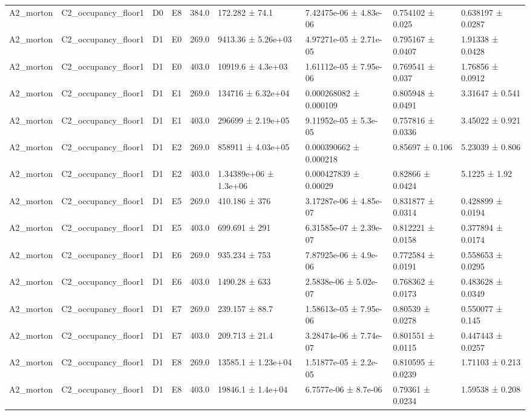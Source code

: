 \begin{table}
\begin{tabular}{lllllllll}
A2\_morton & C2\_occupancy\_floor1 & D0 & E8 & 384.0 & 172.282 ± 74.1 & 7.42475e-06 ± 4.83e-06 & 0.754102 ± 0.025 & 0.638197 ± 0.0287 \\
A2\_morton & C2\_occupancy\_floor1 & D1 & E0 & 269.0 & 9413.36 ± 5.26e+03 & 4.97271e-05 ± 2.71e-05 & 0.795167 ± 0.0407 & 1.91338 ± 0.0428 \\
A2\_morton & C2\_occupancy\_floor1 & D1 & E0 & 403.0 & 10919.6 ± 4.3e+03 & 1.61112e-05 ± 7.95e-06 & 0.769541 ± 0.037 & 1.76856 ± 0.0912 \\
A2\_morton & C2\_occupancy\_floor1 & D1 & E1 & 269.0 & 134716 ± 6.32e+04 & 0.000268082 ± 0.000109 & 0.805948 ± 0.0491 & 3.31647 ± 0.541 \\
A2\_morton & C2\_occupancy\_floor1 & D1 & E1 & 403.0 & 296699 ± 2.19e+05 & 9.11952e-05 ± 5.3e-05 & 0.757816 ± 0.0336 & 3.45022 ± 0.921 \\
A2\_morton & C2\_occupancy\_floor1 & D1 & E2 & 269.0 & 858911 ± 4.03e+05 & 0.000390662 ± 0.000218 & 0.85697 ± 0.106 & 5.23039 ± 0.806 \\
A2\_morton & C2\_occupancy\_floor1 & D1 & E2 & 403.0 & 1.34389e+06 ± 1.3e+06 & 0.000427839 ± 0.00029 & 0.82866 ± 0.0424 & 5.1225 ± 1.92 \\
A2\_morton & C2\_occupancy\_floor1 & D1 & E5 & 269.0 & 410.186 ± 376 & 3.17287e-06 ± 4.85e-07 & 0.831877 ± 0.0314 & 0.428899 ± 0.0194 \\
A2\_morton & C2\_occupancy\_floor1 & D1 & E5 & 403.0 & 699.691 ± 291 & 6.31585e-07 ± 2.39e-07 & 0.812221 ± 0.0158 & 0.377894 ± 0.0174 \\
A2\_morton & C2\_occupancy\_floor1 & D1 & E6 & 269.0 & 935.234 ± 753 & 7.87925e-06 ± 4.9e-06 & 0.772584 ± 0.0191 & 0.558653 ± 0.0295 \\
A2\_morton & C2\_occupancy\_floor1 & D1 & E6 & 403.0 & 1490.28 ± 633 & 2.5838e-06 ± 5.02e-07 & 0.768362 ± 0.0173 & 0.483628 ± 0.0349 \\
A2\_morton & C2\_occupancy\_floor1 & D1 & E7 & 269.0 & 239.157 ± 88.7 & 1.58613e-05 ± 7.95e-06 & 0.80539 ± 0.0278 & 0.550077 ± 0.145 \\
A2\_morton & C2\_occupancy\_floor1 & D1 & E7 & 403.0 & 209.713 ± 21.4 & 3.28474e-06 ± 7.74e-07 & 0.801551 ± 0.0115 & 0.447443 ± 0.0257 \\
A2\_morton & C2\_occupancy\_floor1 & D1 & E8 & 269.0 & 13585.1 ± 1.23e+04 & 1.51877e-05 ± 2.2e-05 & 0.810595 ± 0.0239 & 1.71103 ± 0.213 \\
A2\_morton & C2\_occupancy\_floor1 & D1 & E8 & 403.0 & 19846.1 ± 1.4e+04 & 6.7577e-06 ± 8.7e-06 & 0.79361 ± 0.0234 & 1.59538 ± 0.208 \\

\end{tabular}
\end{table}
